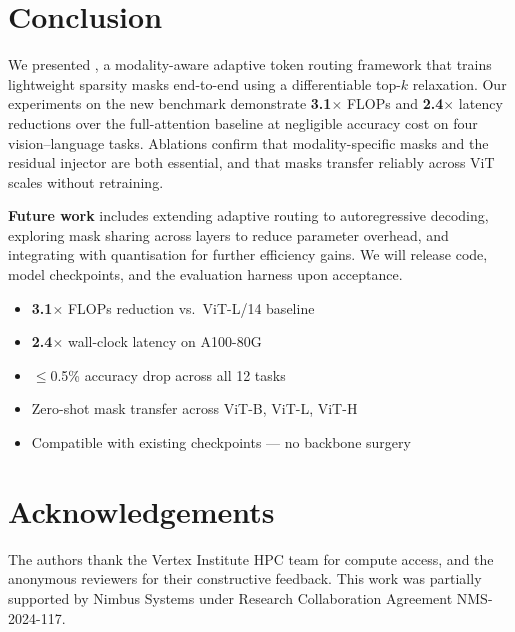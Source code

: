 
\section{Conclusion}

We presented \modelname{}, a modality-aware adaptive token routing
framework that trains lightweight sparsity masks end-to-end using a
differentiable top-\(k\) relaxation. Our experiments on the new
\dataset{} benchmark demonstrate \textbf{3.1\(\times\)} FLOPs and
\textbf{2.4\(\times\)} latency reductions over the full-attention
\baseline{} baseline at negligible accuracy cost on four
vision--language tasks. Ablations confirm that modality-specific masks
and the residual injector are both essential, and that masks
transfer reliably across ViT scales without retraining.

\textbf{Future work} includes extending adaptive routing to autoregressive
decoding, exploring mask sharing across layers to reduce parameter
overhead, and integrating with quantisation for further efficiency gains.
We will release code, model checkpoints, and the \dataset{} evaluation
harness upon acceptance.

\vspace{8pt}
\noindent
\begin{tcolorbox}[methodbox, title={Poster Highlights}]
  \small
  \begin{itemize}[leftmargin=1em, itemsep=3pt, topsep=2pt, label=\textbullet]
    \item \textbf{3.1\(\times\)} FLOPs reduction vs.\ ViT-L/14 baseline
    \item \textbf{2.4\(\times\)} wall-clock latency on A100-80G
    \item \(\leq\)0.5\% accuracy drop across all 12 \dataset{} tasks
    \item Zero-shot mask transfer across ViT-B, ViT-L, ViT-H
    \item Compatible with existing checkpoints --- no backbone surgery
  \end{itemize}
\end{tcolorbox}

\section*{Acknowledgements}

The authors thank the Vertex Institute HPC team for compute access,
and the anonymous reviewers for their constructive feedback.
This work was partially supported by Nimbus Systems under Research
Collaboration Agreement NMS-2024-117.
